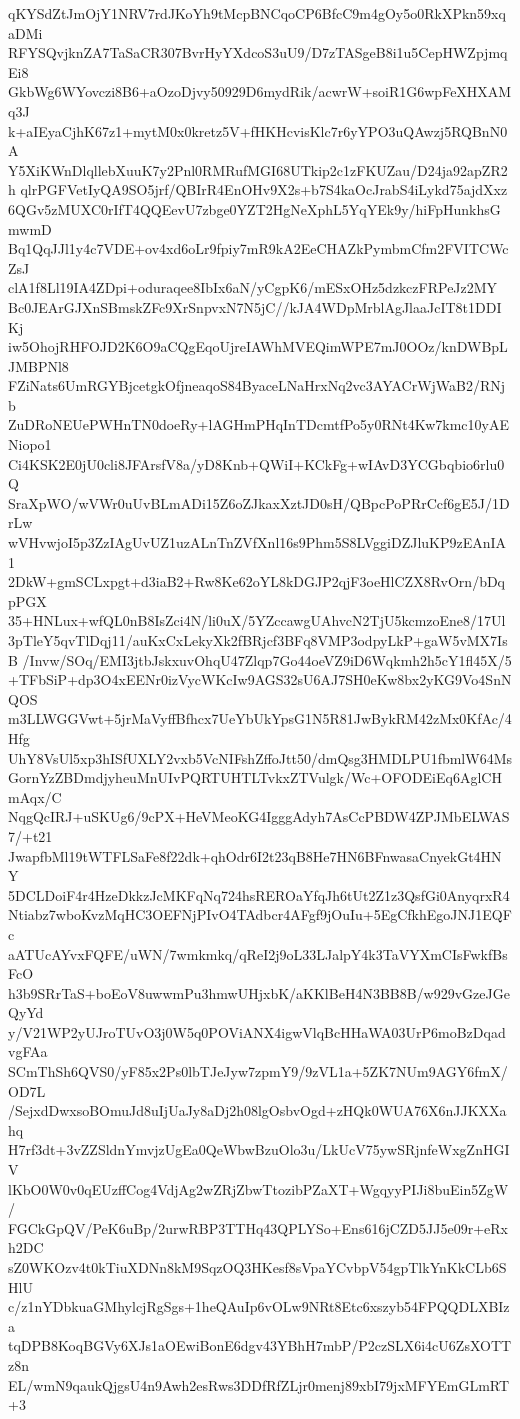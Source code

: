 qKYSdZtJmOjY1NRV7rdJKoYh9tMcpBNCqoCP6BfcC9m4gOy5o0RkXPkn59xqaDMi
RFYSQvjknZA7TaSaCR307BvrHyYXdcoS3uU9/D7zTASgeB8i1u5CepHWZpjmqEi8
GkbWg6WYovczi8B6+aOzoDjvy50929D6mydRik/acwrW+soiR1G6wpFeXHXAMq3J
k+aIEyaCjhK67z1+mytM0x0kretz5V+fHKHcvisKlc7r6yYPO3uQAwzj5RQBnN0A
Y5XiKWnDlqllebXuuK7y2Pnl0RMRufMGI68UTkip2c1zFKUZau/D24ja92apZR2h
qlrPGFVetIyQA9SO5jrf/QBIrR4EnOHv9X2s+b7S4kaOcJrabS4iLykd75ajdXxz
6QGv5zMUXC0rIfT4QQEevU7zbge0YZT2HgNeXphL5YqYEk9y/hiFpHunkhsGmwmD
Bq1QqJJl1y4c7VDE+ov4xd6oLr9fpiy7mR9kA2EeCHAZkPymbmCfm2FVITCWcZsJ
clA1f8Ll19IA4ZDpi+oduraqee8IbIx6aN/yCgpK6/mESxOHz5dzkczFRPeJz2MY
Bc0JEArGJXnSBmskZFc9XrSnpvxN7N5jC//kJA4WDpMrblAgJlaaJcIT8t1DDIKj
iw5OhojRHFOJD2K6O9aCQgEqoUjreIAWhMVEQimWPE7mJ0OOz/knDWBpLJMBPNl8
FZiNats6UmRGYBjcetgkOfjneaqoS84ByaceLNaHrxNq2vc3AYACrWjWaB2/RNjb
ZuDRoNEUePWHnTN0doeRy+lAGHmPHqInTDcmtfPo5y0RNt4Kw7kmc10yAENiopo1
Ci4KSK2E0jU0cli8JFArsfV8a/yD8Knb+QWiI+KCkFg+wIAvD3YCGbqbio6rlu0Q
SraXpWO/wVWr0uUvBLmADi15Z6oZJkaxXztJD0sH/QBpcPoPRrCcf6gE5J/1DrLw
wVHvwjoI5p3ZzIAgUvUZ1uzALnTnZVfXnl16s9Phm5S8LVggiDZJluKP9zEAnIA1
2DkW+gmSCLxpgt+d3iaB2+Rw8Ke62oYL8kDGJP2qjF3oeHlCZX8RvOrn/bDqpPGX
35+HNLux+wfQL0nB8IsZci4N/li0uX/5YZccawgUAhvcN2TjU5kcmzoEne8/17Ul
3pTleY5qvTlDqj11/auKxCxLekyXk2fBRjcf3BFq8VMP3odpyLkP+gaW5vMX7IsB
/Invw/SOq/EMI3jtbJskxuvOhqU47Zlqp7Go44oeVZ9iD6Wqkmh2h5cY1fl45X/5
+TFbSiP+dp3O4xEENr0izVycWKcIw9AGS32sU6AJ7SH0eKw8bx2yKG9Vo4SnNQOS
m3LLWGGVwt+5jrMaVyffBfhcx7UeYbUkYpsG1N5R81JwBykRM42zMx0KfAc/4Hfg
UhY8VsUl5xp3hISfUXLY2vxb5VcNIFshZffoJtt50/dmQsg3HMDLPU1fbmlW64Ms
GornYzZBDmdjyheuMnUIvPQRTUHTLTvkxZTVulgk/Wc+OFODEiEq6AglCHmAqx/C
NqgQcIRJ+uSKUg6/9cPX+HeVMeoKG4IgggAdyh7AsCcPBDW4ZPJMbELWAS7/+t21
JwapfbMl19tWTFLSaFe8f22dk+qhOdr6I2t23qB8He7HN6BFnwasaCnyekGt4HNY
5DCLDoiF4r4HzeDkkzJcMKFqNq724hsREROaYfqJh6tUt2Z1z3QsfGi0AnyqrxR4
Ntiabz7wboKvzMqHC3OEFNjPIvO4TAdbcr4AFgf9jOuIu+5EgCfkhEgoJNJ1EQFc
aATUcAYvxFQFE/uWN/7wmkmkq/qReI2j9oL33LJalpY4k3TaVYXmCIsFwkfBsFcO
h3b9SRrTaS+boEoV8uwwmPu3hmwUHjxbK/aKKlBeH4N3BB8B/w929vGzeJGeQyYd
y/V21WP2yUJroTUvO3j0W5q0POViANX4igwVlqBcHHaWA03UrP6moBzDqadvgFAa
SCmThSh6QVS0/yF85x2Ps0lbTJeJyw7zpmY9/9zVL1a+5ZK7NUm9AGY6fmX/OD7L
/SejxdDwxsoBOmuJd8uIjUaJy8aDj2h08lgOsbvOgd+zHQk0WUA76X6nJJKXXahq
H7rf3dt+3vZZSldnYmvjzUgEa0QeWbwBzuOlo3u/LkUcV75ywSRjnfeWxgZnHGIV
lKbO0W0v0qEUzffCog4VdjAg2wZRjZbwTtozibPZaXT+WgqyyPIJi8buEin5ZgW/
FGCkGpQV/PeK6uBp/2urwRBP3TTHq43QPLYSo+Ens616jCZD5JJ5e09r+eRxh2DC
sZ0WKOzv4t0kTiuXDNn8kM9SqzOQ3HKesf8sVpaYCvbpV54gpTlkYnKkCLb6SHlU
c/z1nYDbkuaGMhylcjRgSgs+1heQAuIp6vOLw9NRt8Etc6xszyb54FPQQDLXBIza
tqDPB8KoqBGVy6XJs1aOEwiBonE6dgv43YBhH7mbP/P2czSLX6i4cU6ZsXOTTz8n
EL/wmN9qaukQjgsU4n9Awh2esRws3DDfRfZLjr0menj89xbI79jxMFYEmGLmRT+3
